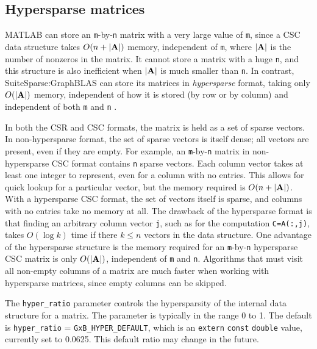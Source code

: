 \documentclass[12pt]{article}
\begin{document}
\subsection{Hypersparse matrices}
\label{hypersparse}

MATLAB can store an \verb'm'-by-\verb'n' matrix with a very large value of
\verb'm', since a CSC data structure takes $O(n+|{\bf A}|)$ memory, independent
of \verb'm', where $|{\bf A}|$ is the number of nonzeros in the matrix.  It
cannot store a matrix with a huge \verb'n', and this structure is also
inefficient when $|{\bf A}|$ is much smaller than \verb'n'.  In contrast,
SuiteSparse:GraphBLAS can store its matrices in {\em hypersparse} format,
taking only $O(|{\bf A}|)$ memory, independent of how it is stored (by row or
by column) and independent of both \verb'm' and \verb'n'
\cite{BulucGilbert08,BulucGilbert12}.

In both the CSR and CSC formats, the matrix is held as a set of sparse vectors.
In non-hypersparse format, the set of sparse vectors is itself dense; all
vectors are present, even if they are empty.  For example, an
\verb'm'-by-\verb'n' matrix in non-hypersparse CSC format contains \verb'n'
sparse vectors.  Each column vector takes at least one integer to represent,
even for a column with no entries.  This allows for quick lookup for a
particular vector, but the memory required is $O(n+|{\bf A}|)$.  With a
hypersparse CSC format, the set of vectors itself is sparse, and columns with
no entries take no memory at all.  The drawback of the hypersparse format is
that finding an arbitrary column vector \verb'j', such as for the computation
\verb'C=A(:,j)', takes $O(\log k)$ time if there $k \le n$ vectors in the data
structure.  One advantage of the hypersparse structure is the memory required
for an \verb'm'-by-\verb'n' hypersparse CSC matrix is only $O(|{\bf A}|)$,
independent of \verb'm' and \verb'n'.  Algorithms that must visit all non-empty
columns of a matrix are much faster when working with hypersparse matrices,
since empty columns can be skipped.

The \verb'hyper_ratio' parameter controls the hypersparsity of the internal
data structure for a matrix.  The parameter is typically in the range 0 to 1.
The default is \verb'hyper_ratio' = \verb'GxB_HYPER_DEFAULT', which is an
\verb'extern' \verb'const' \verb'double' value, currently set to 0.0625.  This
default ratio may change in the future.
\end{document}
